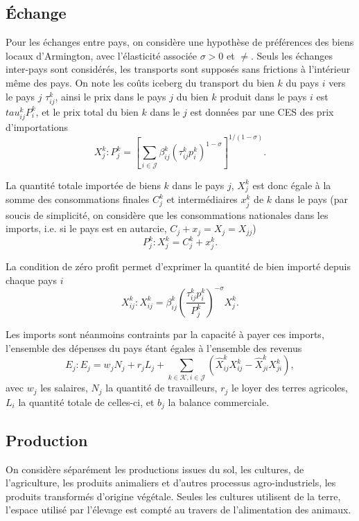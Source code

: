 \subsection{Échange}

Pour les échanges entre pays, on considère une hypothèse de préférences des biens locaux d’Armington, avec l’élasticité associée $\sigma >0$ et $\neq$. Seuls les échanges inter-pays sont considérés, les transports sont supposés sans frictions à l’intérieur même des pays. On note les coûts iceberg du transport du bien $k$ du pays $i$ vers le pays $j$ $\tau_{ij}^k$, ainsi le prix dans le pays $j$ du bien $k$ produit dans le pays $i$ est $tau_{ij}^k P_i^k$, et le prix total du bien $k$ dans le $j$ est données par une CES des prix d’importations
\begin{equation}
	X_j^k: P_j^k = \left[ \sum_{i \in \mathcal{J}} \beta_{ij}^k \left(\tau_{ij}^k p_i^k \right)^{1-\sigma} \right]^{1/(1-\sigma)}.
\end{equation}

La quantité totale importée de biens $k$ dans le pays $j$, $X_j^k$ est donc égale à la somme des consommations finales $C_j^k$ et intermédiaires $x_j^k$ de $k$ dans le pays (par soucis de simplicité, on considère que les consommations nationales dans les imports, i.e. si le pays est en autarcie, $C_j + x_j = X_j = X_{jj}$)
\begin{equation}
	P_j^k: X_j^k = C_j^k + x_j^k.
\end{equation}

La condition de zéro profit permet d’exprimer la quantité de bien importé depuis chaque pays $i$
\begin{equation}
	X_{ij}^k: X_{ij}^k = \beta_{ij}^k \left( \frac{\tau_{ij}^k p_i^k}{P_j^k}\right)^{- \sigma} X_{j}^k.
\end{equation}

Les imports sont néanmoins contraints par la capacité à payer ces imports, l’ensemble des dépenses du pays étant égales à l’ensemble des revenus
\begin{equation}
	E_j: E_j = w_j N_j + r_j L_j + \sum_{k \in \mathcal{K},i \in \mathcal{J}} \left(\hat{X}_{ij}^k X_{ij}^k - \hat{X}_{ji}^k X_{ji}^k \right),
\end{equation}
avec $w_j$ les salaires, $N_j$ la quantité de travailleurs, $r_j$ le loyer des terres agricoles, $L_i$ la quantité totale de celles-ci, et $b_j$ la balance commerciale.

\subsection{Production}
On considère séparément les productions issues du sol, les cultures, de l’agriculture, les produits animaliers et d’autres processus agro-industriels, les produits transformés d’origine végétale. Seules les cultures utilisent de la terre, l’espace utilisé par l’élevage est compté au travers de l’alimentation des animaux.

